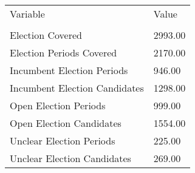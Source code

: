 \begin{tabular}{l|l}
\toprule
                      Variable &         Value \\
                               &               \\
\midrule
              Election Covered &       2993.00 \\
      Election Periods Covered &       2170.00 \\
    Incumbent Election Periods &        946.00 \\
 Incumbent Election Candidates &       1298.00 \\
         Open Election Periods &        999.00 \\
      Open Election Candidates &       1554.00 \\
      Unclear Election Periods &        225.00 \\
   Unclear Election Candidates &        269.00 \\
\bottomrule
\end{tabular}
